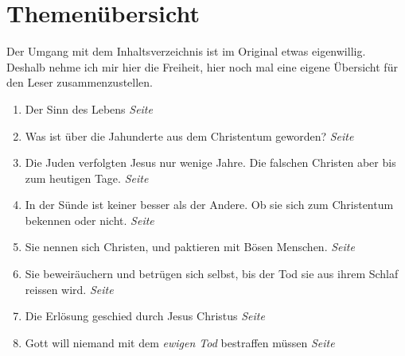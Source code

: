 \chapter{Themenübersicht} \label{ref:theme_nuebersicht}


Der Umgang mit dem Inhaltsverzeichnis ist im Original etwas eigenwillig. Deshalb
nehme ich mir hier die Freiheit, hier noch mal eine eigene Übersicht für den
Leser zusammenzustellen.

\begin{enumerate}
 \item Der Sinn des Lebens
 \dotfill \textit{Seite \pageref{ref:vorw_sinndes_lebens}}\\

 \item Was ist über die Jahunderte aus dem Christentum geworden?
 \dotfill \textit{Seite \pageref{ref:01_02_urchristentum}}\\
 
 \item Die Juden verfolgten Jesus nur wenige Jahre. Die falschen Christen aber
bis zum heutigen Tage.
 \dotfill \textit{Seite \pageref{ref:01_04_zweite_kreuzigung}}\\
 
 \item In der Sünde ist keiner besser als der Andere. Ob sie sich zum
Christentum bekennen oder nicht.
 \dotfill \textit{Seite \pageref{ref:01_05_in_suende_gleich}}\\
 
 \item Sie nennen sich Christen, und paktieren mit Bösen Menschen.
 \dotfill \textit{Seite
\pageref{ref:01_05_in_suende_verbinden}}\\

 \item Sie beweiräuchern und betrügen sich selbst, bis der Tod sie aus ihrem
Schlaf reissen wird.
 \dotfill \textit{Seite \pageref{ref:01_07_selbstbetrug}}\\
 
 \item Die Erlösung geschied durch Jesus Christus
 \dotfill \textit{Seite
\pageref{ref:01_10_jesus_der_erloeser}}\\

 \item Gott will niemand mit dem \textit{ewigen Tod} bestraffen müssen
 \dotfill \textit{Seite
\pageref{ref:02_02_kein_gefallen_am_tod}}\\


\end{enumerate}
